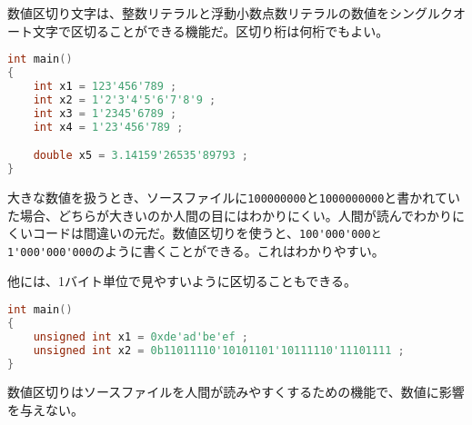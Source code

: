%

数値区切り文字は、整数リテラルと浮動小数点数リテラルの数値をシングルクオート文字で区切ることができる機能だ。区切り桁は何桁でもよい。

\begin{lstlisting}[language=C++]
int main()
{
    int x1 = 123'456'789 ;
    int x2 = 1'2'3'4'5'6'7'8'9 ; 
    int x3 = 1'2345'6789 ;
    int x4 = 1'23'456'789 ;

    double x5 = 3.14159'26535'89793 ;
}
\end{lstlisting}

大きな数値を扱うとき、ソースファイルに\lstinline!100000000!と\lstinline!1000000000!と書かれていた場合、どちらが大きいのか人間の目にはわかりにくい。人間が読んでわかりにくいコードは間違いの元だ。数値区切りを使うと、\lstinline!100'000'000と1'000'000'000!のように書くことができる。これはわかりやすい。

他には、1バイト単位で見やすいように区切ることもできる。

\begin{lstlisting}[language=C++]
int main()
{
    unsigned int x1 = 0xde'ad'be'ef ;
    unsigned int x2 = 0b11011110'10101101'10111110'11101111 ;
}
\end{lstlisting}

数値区切りはソースファイルを人間が読みやすくするための機能で、数値に影響を与えない。
